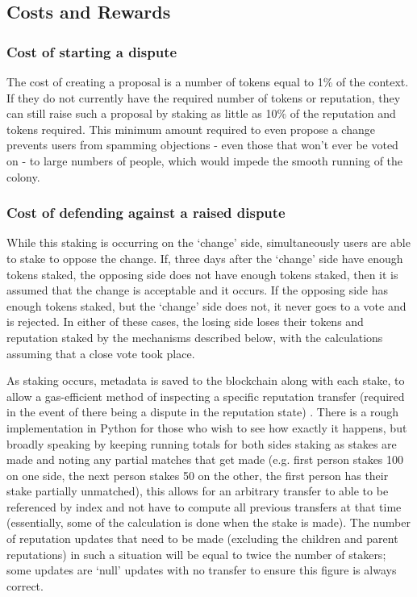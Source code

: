 \subsection{Costs and Rewards}
\subsubsection{Cost of starting a dispute}
The cost of creating a proposal is a number of tokens equal to 1\% of the context. If they do not currently have the required number of tokens or reputation, they can still raise such a proposal by staking as little as 10\% of the reputation and tokens required. This minimum amount required to even propose a change prevents users from spamming objections - even those that won’t ever be voted on - to large numbers of people, which would impede the smooth running of the colony.

\subsubsection{Cost of defending against a raised dispute}
While this staking is occurring on the ‘change’ side, simultaneously users are able to stake to oppose the change. If, three days after the ‘change’ side have enough tokens staked, the opposing side does not have enough tokens staked, then it is assumed that the change is acceptable and it occurs. If the opposing side has enough tokens staked, but the ‘change’ side does not, it never goes to a vote and is rejected. In either of these cases, the losing side loses their tokens and reputation staked by the mechanisms described below, with the calculations assuming that a close vote took place.

As staking occurs, metadata is saved to the blockchain along with each stake, to allow a gas-efficient method of inspecting a specific reputation transfer (required in the event of there being a dispute in the reputation state) . There is a rough implementation in Python for those who wish to see how exactly it happens, but broadly speaking by keeping running totals for both sides staking as stakes are made and noting any partial matches that get made (e.g. first person stakes 100 on one side, the next person stakes 50 on the other, the first person has their stake partially unmatched), this allows for an arbitrary transfer to able to be referenced by index and not have to compute all previous transfers at that time (essentially, some of the calculation is done when the stake is made).  The number of reputation updates that need to be made (excluding the children and parent reputations) in such a situation will be equal to twice the number of stakers; some updates are ‘null’ updates with no transfer to ensure this figure is always correct.

